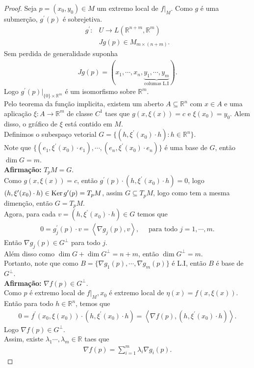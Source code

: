 \begin{proof} 
  Seja $p=(x_0,y_0)\in M$ um extremo local de $f\big|_{M}$. Como $g$ é uma submerção, $g^{\prime}(p)$ é sobrejetiva.
  \begin{align*}
    g^{\prime}:&U\to L(\mathbb{R}^{n+m},\mathbb{R}^{m})\\
    &Jg(p)\in M_{m\times (n+m)}.
  \end{align*}
  Sem perdida de generalidade suponha
  \begin{align*}
    Jg(p)=(x_1,\cdots,x_n,\underbrace{y_1,\cdots,y_m}_{\text{columas L.I}}).
  \end{align*}
  Logo $g^{\prime}(p)\big|_{\{0\}\times \mathbb{R}^{m}}$ é um isomorfismo sobre $\mathbb{R}^{m}$.\\
  Pelo teorema da função implicita, existem um aberto $A\subseteq \mathbb{R}^{n}$ com $x\in A$ e uma aplicação $\xi:A\to\mathbb{R}^{m}$ de classe $C^{1}$ taes que $g(x,\xi(x))=c$ e $\xi(x_0)=y_0$. Alem disso, o gráfico de $\xi$ está contido em $M$.\\
  Definimos o subespaço vetorial $G=\{(h,\xi^{\prime}
  (x_0)\cdot h):h\in\mathbb{R}^{n}\}$.\\
  Note que $\{(e_1,\xi^{\prime}(x_0)\cdot e_1),\cdots,(e_n,\xi^{\prime}(x_0)\cdot e_n)\}$ é uma base de $G$, então $\dim G=m$.\\
  \textbf{Afirmação:} $T_{p}M=G$.\\
    Como $g(x,\xi(x))=c$, então $g^{\prime}(p)\cdot(h,\xi^{\prime}(x_0)\cdot h)=0$, logo $(h,\xi^{\prime}(x_0)\cdot h)\in \operatorname{Ker} g^{\prime}(p)=T_{p}M$, assim $G\subseteq T_{p}M$, logo como tem a mesma dimenção, então $G=T_{p}M$.\\
  Agora, para cada $v=(h,\xi^{\prime}(x_0)\cdot h)\in G$ temos que
  \begin{align*}
    0=g^{\prime}_{j}(p)\cdot v=\left\langle \nabla g_{j}(p),v \right\rangle,\quad\text{ para todo }j=1,\cdots,m.
  \end{align*}
  Então $\nabla g_{j}(p)\in G^{\perp}$ para todo $j$.\\
  Além disso como $\dim G + \dim G^{\perp}=n+m$, então $\dim G^{\perp}=m$.\\
  Portanto, note que como $B=\{\nabla g_1(p),\cdots,\nabla g_m(p)\}$ é L.I, então $B$ é base de $G^{\perp}$.\\
  \textbf{Afirmação:} $\nabla f(p)\in G^{\perp}$.\\
    Como $p$ é extremo local de $f\big|_{M},x_{0}$ é extremo local de $\eta(x)=f(x,\xi(x))$. Então para todo $h\in\mathbb{R}^{n}$, temos que
    \begin{align*}
      0=f^{\prime}(x_0,\xi(x_0))\cdot(h,\xi^{\prime}(x_0)\cdot h)=\left\langle \nabla f(p),(h,\xi^{\prime}(x_0)\cdot h) \right\rangle.
    \end{align*}
    Logo $\nabla f(p)\in G^{\perp}$.\\
  Assim, existe $\lambda_1\cdots,\lambda_{m}\in\mathbb{R}$ taes que 
  \begin{align*}
    \nabla f(p)=\sum_{i=1}^{m}\lambda_{i}\nabla g_{i}(p).
  \end{align*}
\end{proof}
